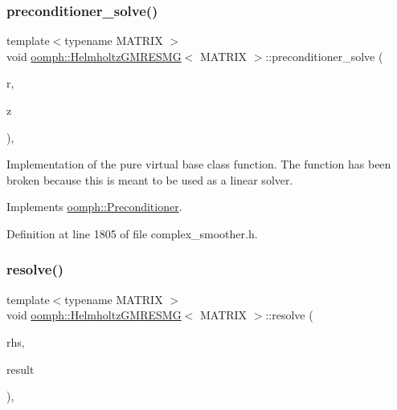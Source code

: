 \subsubsection{\texorpdfstring{preconditioner\+\_\+solve()}{preconditioner\_solve()}}
{\footnotesize\ttfamily template$<$typename M\+A\+T\+R\+IX $>$ \\
void \hyperlink{classoomph_1_1HelmholtzGMRESMG}{oomph\+::\+Helmholtz\+G\+M\+R\+E\+S\+MG}$<$ M\+A\+T\+R\+IX $>$\+::preconditioner\+\_\+solve (\begin{DoxyParamCaption}\item[{const \hyperlink{classoomph_1_1DoubleVector}{Double\+Vector} \&}]{r,  }\item[{\hyperlink{classoomph_1_1DoubleVector}{Double\+Vector} \&}]{z }\end{DoxyParamCaption})\hspace{0.3cm}{\ttfamily [inline]}, {\ttfamily [virtual]}}



Implementation of the pure virtual base class function. The function has been broken because this is meant to be used as a linear solver. 



Implements \hyperlink{classoomph_1_1Preconditioner_ace1199369e4465cd2b9a34884bb64ec8}{oomph\+::\+Preconditioner}.



Definition at line 1805 of file complex\+\_\+smoother.\+h.

\mbox{\label{classoomph_1_1HelmholtzGMRESMG_ad6937ea7f72719eb9e33c28c002fa380}} 
\subsubsection{\texorpdfstring{resolve()}{resolve()}}
{\footnotesize\ttfamily template$<$typename M\+A\+T\+R\+IX $>$ \\
void \hyperlink{classoomph_1_1HelmholtzGMRESMG}{oomph\+::\+Helmholtz\+G\+M\+R\+E\+S\+MG}$<$ M\+A\+T\+R\+IX $>$\+::resolve (\begin{DoxyParamCaption}\item[{const \hyperlink{classoomph_1_1DoubleVector}{Double\+Vector} \&}]{rhs,  }\item[{\hyperlink{classoomph_1_1DoubleVector}{Double\+Vector} \&}]{result }\end{DoxyParamCaption})\hspace{0.3cm}{\ttfamily [inline]}, {\ttfamily [virtual]}}



